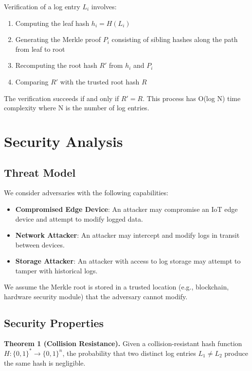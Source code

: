 \documentclass[a4paper,10pt]{article}
\begin{document}
Verification of a log entry $L_i$ involves:
\begin{enumerate}
\item Computing the leaf hash $h_i = H(L_i)$
\item Generating the Merkle proof $P_i$ consisting of sibling hashes along the path from leaf to root
\item Recomputing the root hash $R'$ from $h_i$ and $P_i$
\item Comparing $R'$ with the trusted root hash $R$
\end{enumerate}

The verification succeeds if and only if $R' = R$. This process has O(log N) time complexity where N is the number of log entries.

\section{Security Analysis}
\label{sec:security}

\subsection{Threat Model}

We consider adversaries with the following capabilities:
\begin{itemize}
\item \textbf{Compromised Edge Device}: An attacker may compromise an IoT edge device and attempt to modify logged data.
\item \textbf{Network Attacker}: An attacker may intercept and modify logs in transit between devices.
\item \textbf{Storage Attacker}: An attacker with access to log storage may attempt to tamper with historical logs.
\end{itemize}

We assume the Merkle root is stored in a trusted location (e.g., blockchain, hardware security module) that the adversary cannot modify.

\subsection{Security Properties}

\textbf{Theorem 1 (Collision Resistance).} Given a collision-resistant hash function $H: \{0,1\}^* \rightarrow \{0,1\}^n$, the probability that two distinct log entries $L_1 \neq L_2$ produce the same hash is negligible.
\end{document}

